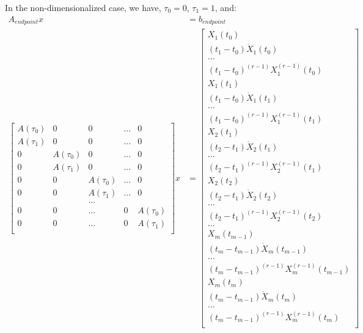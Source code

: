 \documentclass[11pt]{article}
\begin{document}
In the non-dimensionalized case, we have, $\tau_0=0$, $\tau_1=1$, and:
\begin{align}
\nonumber A_{endpoint} x &= b_{endpoint} \\
\label{eqn: endpoint} \begin{bmatrix}
 A(\tau_0) & 0 & 0 & ... & 0 \\
 A(\tau_1) & 0 & 0 & ... & 0 \\
 0 & A(\tau_0) & 0 & ... & 0 \\
 0 & A(\tau_1) & 0 & ... & 0 \\
 0 & 0 & A(\tau_0) & ... & 0 \\
 0 & 0 & A(\tau_1) & ... & 0 \\
 & & ... & & \\
 0 & 0 & ... & 0 & A(\tau_0) \\
 0 & 0 & ... & 0 & A(\tau_1)  \\
 \end{bmatrix}
 x 
 &= 
 \begin{bmatrix}
  X_1 (t_0) \\
  (t_1-t_0) \dot{X}_1 (t_0) \\
  ... \\
  (t_1-t_0)^{(r-1)}  X^{(r-1)}_1 (t_0) \\
    X_1 (t_1) \\
  (t_1-t_0) \dot{X}_1 (t_1) \\
  ... \\
  (t_1-t_0)^{(r-1)} X^{(r-1)}_1 (t_1) \\
     X_2 (t_1) \\
 (t_2-t_1) \dot{X}_2  (t_1) \\
  ... \\
 (t_2-t_1)^{(r-1)} X^{(r-1)}_2 (t_1) \\
     X_2 (t_2) \\
 (t_2-t_1)  \dot{X}_2 (t_2) \\
  ... \\
 (t_2-t_1)^{(r-1)}  X^{(r-1)}_2 (t_2) \\
  ... \\
     X_m (t_{m-1}) \\
 (t_m-t_{m-1}) \dot{X}_m  (t_{m-1}) \\
  ... \\
(t_m-t_{m-1})^{(r-1)}  X^{(r-1)}_m (t_{m-1}) \\
     X_m (t_m) \\
(t_m-t_{m-1})  \dot{X}_m  (t_m) \\
  ... \\
(t_m-t_{m-1})^{(r-1)}  X^{(r-1)}_m (t_m) \\
 \end{bmatrix} 
\end{align}
\end{document}
